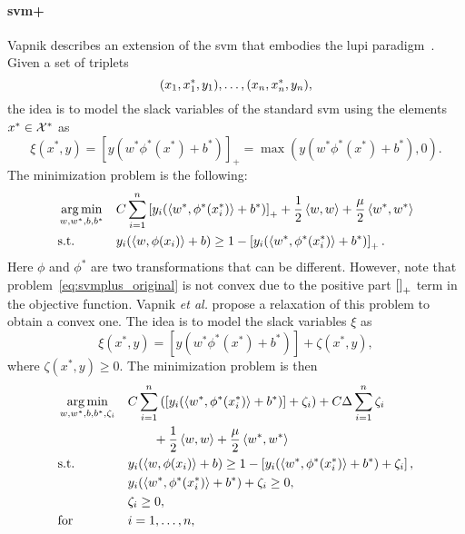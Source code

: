\paragraph*{\acrshort{svm}+ \\}
Vapnik describes an extension of the \acrshort{svm} that embodies the \acrshort{lupi} paradigm~\citep{VapnikV09,VapnikI15a}. Given a set of triplets
\begin{equation}
    \nonumber
    (x_1, x^*_1, y_1), \ldots, (x_n, x^*_n, y_n) ,
\end{equation}
the idea is to model the slack variables of the standard \acrshort{svm} using the elements $x^* \in \mathcal{X}^*$ as
$$ \xi(x^*, y) = \left[y (w^* \phi^*(x^*) + b^*) \right]_+  = \max\left( y (w^* \phi^*(x^*) + b^*), 0  \right).$$
The minimization problem is the following:
\begin{equation}
    \label{eq:svmplus_original}
    \begin{aligned}
        & \argmin_{w, w^*, b, b^*}
        & &  C \sum_{i=1}^\nsamples \left[y_i (\dotp{w^*}{\phi^*(x_i^*)} + b^*) \right]_+ + \frac{1}{2} \dotp{w}{w} + \frac{\mu}{2} \dotp{w^*}{w^*} \\
        & \text{s.t.}
        & & y_{i} ( \dotp{w}{\phi(x_{i})} + b) \geq 1 - \left[y_i (\dotp{w^*}{\phi^*(x^*_i)} + b^*) \right]_+ .
    \end{aligned}
\end{equation}
Here $\phi$ and $\phi^*$ are two transformations that can be different.
However, note that problem~\eqref{eq:svmplus_original} is not convex due to the positive part $\left[\right]_{+}$ term in the objective function. Vapnik \emph{et al.} propose a relaxation of this problem to obtain a convex one. The idea is to model the slack variables $\xi$ as
$$ \xi(x^*, y) = \left[y (w^* \phi^*(x^*) + b^*) \right] + \zeta(x^*, y) ,$$
where $\zeta(x^*, y) \geq 0$.
The minimization problem is then
\begin{equation}
    \label{eq:svmplus_delta_primal}
    \begin{aligned}
        & \argmin_{w, w^*, b, b^*, \zeta_i}
        & &  C \sum_{i=1}^\nsamples \left( \left[y_i (\dotp{w^*}{\phi^*(x_i^*)} + b^*) \right] + \zeta_i \right) + C \Delta \sum_{i=1}^\nsamples \zeta_i \\
        & & &\qquad + \frac{1}{2} \dotp{w}{w} + \frac{\mu}{2} \dotp{w^*}{w^*} \\
        & \text{s.t.}
        & & y_{i} ( \dotp{w}{\phi(x_{i})} + b) \geq 1 - \left[y_i (\dotp{w^*}{\phi^*(x^*_i)} + b^*) + \zeta_i \right] ,\\
        & & &y_i (\dotp{w^*}{\phi^*(x^*_i)} + b^*) + \zeta_i \geq 0 ,\\
        & & &\zeta_i \geq 0, \\
        & \text{for } & & i=1, \ldots, \nsamples,
    \end{aligned}
\end{equation}
